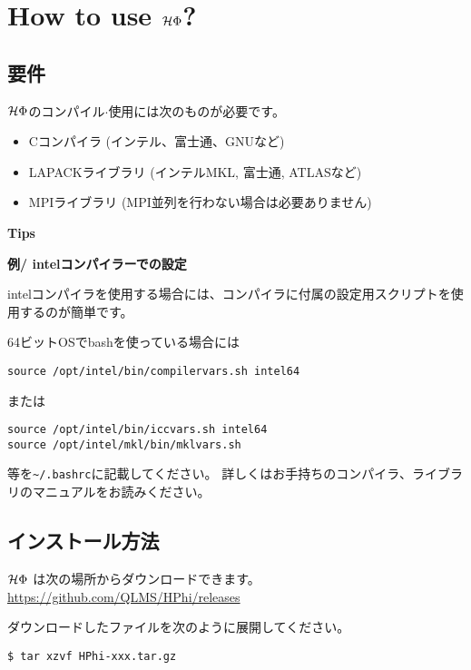 \chapter{How to use $\mathcal{H} \Phi$?}
\label{Ch:HowTo}

\section{要件}

$\mathcal{H} \Phi$のコンパイル$\cdot$使用には次のものが必要です。
\begin{itemize}
\item Cコンパイラ (インテル、富士通、GNUなど)
\item LAPACKライブラリ (インテルMKL, 富士通, ATLASなど)
\item MPIライブラリ (MPI並列を行わない場合は必要ありません)
\end{itemize}

\begin{screen}
\Large 
{\bf Tips}
\normalsize

{\bf 例/ intelコンパイラーでの設定}

intelコンパイラを使用する場合には、コンパイラに付属の設定用スクリプトを使用するのが簡単です。

64ビットOSでbashを使っている場合には
\begin{verbatim}
source /opt/intel/bin/compilervars.sh intel64
\end{verbatim}
または
\begin{verbatim}
source /opt/intel/bin/iccvars.sh intel64
source /opt/intel/mkl/bin/mklvars.sh
\end{verbatim}
等を\verb|~/.bashrc|に記載してください。
詳しくはお手持ちのコンパイラ、ライブラリのマニュアルをお読みください。

\end{screen}


\section{インストール方法}

$\mathcal{H} \Phi$ は次の場所からダウンロードできます。\\
\url{https://github.com/QLMS/HPhi/releases}

ダウンロードしたファイルを次のように展開してください。
\begin{verbatim}
$ tar xzvf HPhi-xxx.tar.gz
\end{verbatim}

